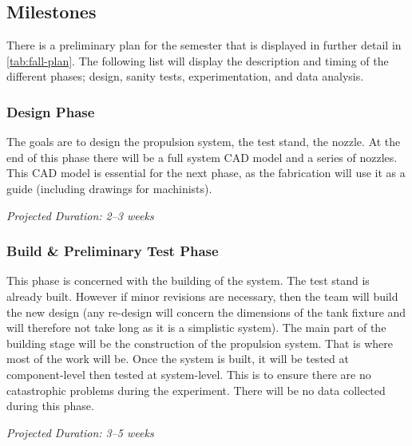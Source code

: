 \documentclass[conference]{IEEEtran} %
\begin{document}
\subsection{Milestones}
\label{subsec:milestones}

There is a preliminary plan for the semester that is displayed in further detail in \autoref{tab:fall-plan}. The following list will display the description and timing
of the different phases; design, sanity tests, experimentation, and data analysis.

\subsubsection{Design Phase}
\label{subsubsec: design phase}
    The goals are to design the propulsion system, the test stand, the nozzle. At the end of this phase
    there will be a full system CAD model and a series of nozzles. This CAD model is essential for the next phase, as the fabrication
    will use it as a guide (including drawings for machinists).

    \textit{Projected Duration: 2--3 weeks}

\subsubsection{Build \& Preliminary Test Phase}
\label{subsubsec: sanity test phase}
    This phase is concerned with the building of the system. The test stand is already built. However if minor revisions are necessary, then the team will
    build the new design (any re-design will concern the dimensions of the tank fixture and will therefore not take long as it is a simplistic system).
    The main part of the building stage will be the construction of the propulsion system. That is where most of the work will be. Once the system is built,
    it will be tested at component-level then tested at system-level. This is to ensure there are no catastrophic problems during the experiment.
    There will be no data collected during this phase.

    \textit{Projected Duration: 3--5 weeks}
\end{document}
